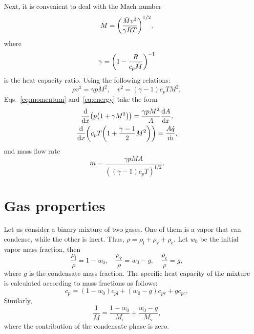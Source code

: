 \documentclass{article}
\newcommand{\vap}{\text{v}}
\newcommand{\ine}{\text{i}}
\newcommand{\con}{\text{c}}
\begin{document}
Next, it is convenient to deal with the Mach number
\begin{equation}\label{eq:Mach}
    M = \qty(\frac{\bar{M}v^2}{\gamma RT})^{1/2},
\end{equation}
where
\begin{equation}\label{eq:gamma}
    \gamma = \qty(1-\frac{R}{c_p\bar{M}})^{-1}
\end{equation}
is the heat capacity ratio.
Using the following relations:
\begin{equation*}
    \rho v^2 = \gamma p M^2, \quad v^2 = (\gamma-1)c_pT M^2,
\end{equation*}
Eqs.~\eqref{eq:momentum} and~\eqref{eq:energy} take the form
\begin{gather}
    \dv{x}(p\qty(1 + \gamma M^2)) = \frac{\gamma p M^2}{A}\dv{A}{x}, \label{eq:momentum2}\\
    \dv{x}(c_pT\qty(1 + \frac{\gamma-1}{2}M^2)) = \frac{A\dot{q}}{\dot{m}}, \label{eq:energy2}
\end{gather}
and mass flow rate
\begin{equation}\label{eq:dotm}
    \dot{m} = \frac{\gamma pMA}{((\gamma-1)c_pT)^{1/2}}.
\end{equation}

\section{Gas properties}

Let us consider a binary mixture of two gases.
One of them is a vapor that can condense, while the other is inert.
Thus, $\rho = \rho_\ine + \rho_\vap + \rho_\con$.
Let $w_0$ be the initial vapor mass fraction, then
\begin{equation}\label{eq:rhoM}
    \frac{\rho_\ine}{\rho} = 1-w_0, \quad \frac{\rho_\vap}{\rho} = w_0-g, \quad \frac{\rho_\con}{\rho} = g,
\end{equation}
where $g$ is the condensate mass fraction.
The specific heat capacity of the mixture is calculated according to mass fractions as follows:
\begin{equation}\label{eq:c_p}
    c_p = (1-w_0)c_{p\ine} + (w_0-g)c_{p\vap} + gc_{p\con},
\end{equation}
Similarly,
\begin{equation}\label{eq:M}
    \frac1{\bar{M}} = \frac{1-w_0}{M_\ine} + \frac{w_0-g}{M_\vap},
\end{equation}
where the contribution of the condensate phase is zero.
\end{document}
